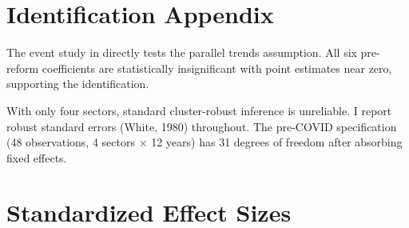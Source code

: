 \documentclass[12pt]{article}
\begin{document}
\section{Identification Appendix}

The event study in  directly tests the parallel trends assumption. All six pre-reform coefficients are statistically insignificant with point estimates near zero, supporting the identification.

With only four sectors, standard cluster-robust inference is unreliable. I report robust standard errors (White, 1980) throughout. The pre-COVID specification (48 observations, 4 sectors $\times$ 12 years) has 31 degrees of freedom after absorbing fixed effects.

\section{Standardized Effect Sizes}
\label{sec:sde}


\end{document}

